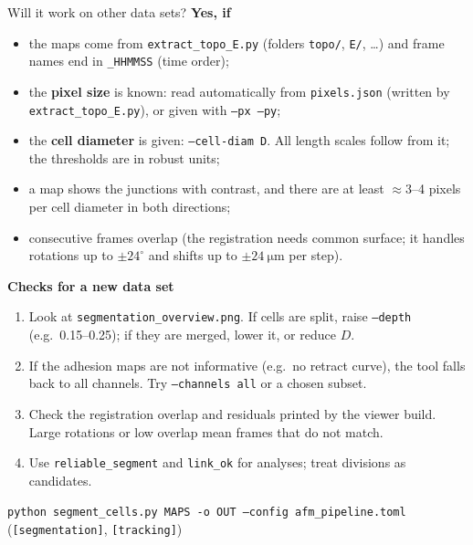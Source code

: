 \documentclass[aspectratio=169,9pt]{beamer}
\begin{document}
\begin{frame}{Will it work on other data sets?}
\footnotesize
\textbf{Yes, if}
\begin{itemize}
\item the maps come from \texttt{extract\_topo\_E.py} (folders \texttt{topo/}, \texttt{E/}, \dots) and frame names end in \texttt{\_HHMMSS} (time order);
\item the \textbf{pixel size} is known: read automatically from \texttt{pixels.json} (written by \texttt{extract\_topo\_E.py}), or given with \texttt{--px --py};
\item the \textbf{cell diameter} is given: \texttt{--cell-diam D}. All length scales follow from it; the thresholds are in robust units;
\item a map shows the junctions with contrast, and there are at least $\approx3$--4 pixels per cell diameter in both directions;
\item consecutive frames overlap (the registration needs common surface; it handles rotations up to $\pm24^\circ$ and shifts up to $\pm\SI{24}{\micro\metre}$ per step).
\end{itemize}
\textbf{Checks for a new data set}
\begin{enumerate}
\item Look at \texttt{segmentation\_overview.png}. If cells are split, raise \texttt{--depth} (e.g.\ 0.15--0.25); if they are merged, lower it, or reduce $D$.
\item If the adhesion maps are not informative (e.g.\ no retract curve), the tool falls back to all channels. Try \texttt{--channels all} or a chosen subset.
\item Check the registration overlap and residuals printed by the viewer build. Large rotations or low overlap mean frames that do not match.
\item Use \texttt{reliable\_segment} and \texttt{link\_ok} for analyses; treat divisions as candidates.
\end{enumerate}
\texttt{python segment\_cells.py MAPS -o OUT --config afm\_pipeline.toml} (\texttt{[segmentation]}, \texttt{[tracking]})
\end{frame}
\end{document}
